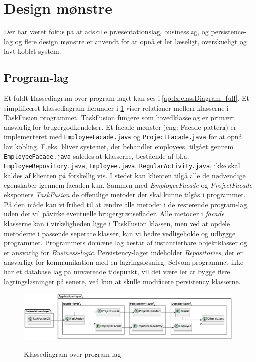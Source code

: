 \section{Design mønstre} \label{chap:design}
Der har været fokus på at adskille præsentationslag, businesslag, og persistence-lag og flere design mønstre er anvendt for at opnå et let læseligt, overskueligt og lavt koblet system.
\subsection{Program-lag}
Et fuldt klassediagram over program-laget kan ses i \cref{apdx:classDiagram_full}. Et simplificeret klassediagram herunder i \cref{fig:class_persistency_layer} viser relationer mellem klasserne i TaskFusion programmet. TaskFusion fungere som hovedklasse og er primært ansvarlig for brugergodkendelser. Et facade mønster (eng: Facade pattern) er implementeret med \texttt{EmployeeFacade.java} og \texttt{ProjectFacade.java} for at opnå lav kobling. F.eks. bliver systemet, der behandler employees, tilgået gennem \texttt{EmployeeFacade.java} således at klasserne, bestående af bl.a. \texttt{EmployeeRepository.java}, \texttt{Employee.java}, \texttt{RegularActivity.java}, ikke skal kaldes af klienten på forskellig vis. I stedet kan klienten tilgå alle de nødvendige egenskaber igennem facaden kun. Sammen med \textit{EmployeeFacade} og \textit{ProjectFacade} eksponere \textit{TaskFusion} de offentlige metoder der skal kunne tilgås i programmet. På den måde kan vi frihed til at ændre alle metoder i de resterende program-lag, uden det vil påvirke eventuelle brugergrænseflader. Alle metoder i \textit{facade} klasserne kan i virkeligheden ligge i TaskFusion klassen, men ved at opdele metoderne i passende seperate klasser, kan vi bedre vedligeholde og udbygge programmet.
Programmets domæne lag består af instantierbare objektklasser og er ansvarlig for \textit{Business-logic}. Persistency-laget indeholder \textit{Repositories}, der er ansvarlige for kommunikation med en lagringsløsning. Selvom programmet ikke har et database lag på nuværende tidspunkt, vil det være let at bygge flere lagringsløsninger på senere, ved kun at skulle modificere persistency klasserne.
\begin{figure}[H]
    \centering
    \caption{Klassediagram over program-lag}
    \includegraphics[width = \textwidth]{TaskFusion/out/assets/diagrams/class_persistency_layer/ClassDiagram_layer.png}
    \label{fig:class_persistency_layer}
\end{figure}
